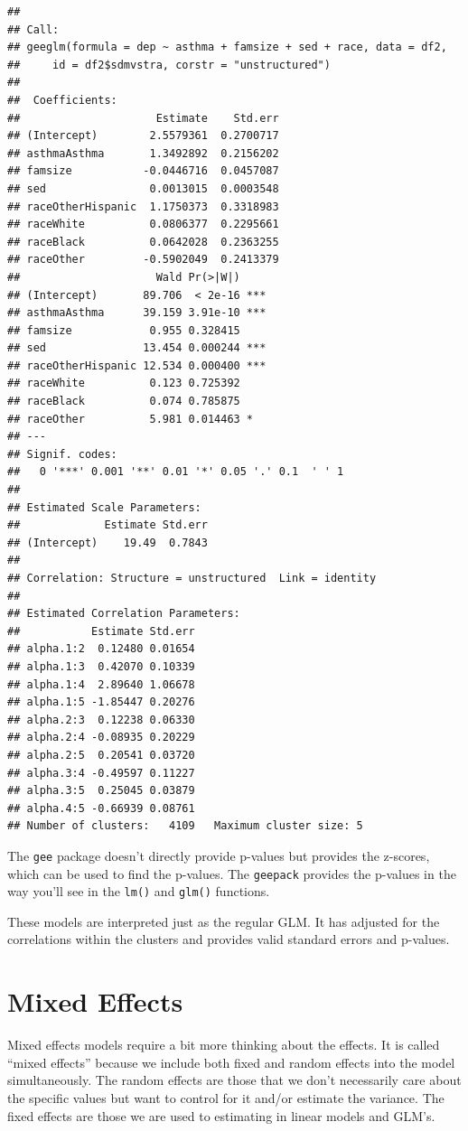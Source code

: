 \documentclass[]{tufte-book}
\theoremstyle{definition}
\theoremstyle{definition}
\theoremstyle{remark}
\begin{document}
\begin{verbatim}
## 
## Call:
## geeglm(formula = dep ~ asthma + famsize + sed + race, data = df2, 
##     id = df2$sdmvstra, corstr = "unstructured")
## 
##  Coefficients:
##                     Estimate    Std.err
## (Intercept)        2.5579361  0.2700717
## asthmaAsthma       1.3492892  0.2156202
## famsize           -0.0446716  0.0457087
## sed                0.0013015  0.0003548
## raceOtherHispanic  1.1750373  0.3318983
## raceWhite          0.0806377  0.2295661
## raceBlack          0.0642028  0.2363255
## raceOther         -0.5902049  0.2413379
##                     Wald Pr(>|W|)    
## (Intercept)       89.706  < 2e-16 ***
## asthmaAsthma      39.159 3.91e-10 ***
## famsize            0.955 0.328415    
## sed               13.454 0.000244 ***
## raceOtherHispanic 12.534 0.000400 ***
## raceWhite          0.123 0.725392    
## raceBlack          0.074 0.785875    
## raceOther          5.981 0.014463 *  
## ---
## Signif. codes:  
##   0 '***' 0.001 '**' 0.01 '*' 0.05 '.' 0.1  ' ' 1
## 
## Estimated Scale Parameters:
##             Estimate Std.err
## (Intercept)    19.49  0.7843
## 
## Correlation: Structure = unstructured  Link = identity 
## 
## Estimated Correlation Parameters:
##           Estimate Std.err
## alpha.1:2  0.12480 0.01654
## alpha.1:3  0.42070 0.10339
## alpha.1:4  2.89640 1.06678
## alpha.1:5 -1.85447 0.20276
## alpha.2:3  0.12238 0.06330
## alpha.2:4 -0.08935 0.20229
## alpha.2:5  0.20541 0.03720
## alpha.3:4 -0.49597 0.11227
## alpha.3:5  0.25045 0.03879
## alpha.4:5 -0.66939 0.08761
## Number of clusters:   4109   Maximum cluster size: 5
\end{verbatim}

The \texttt{gee} package doesn't directly provide p-values but provides
the z-scores, which can be used to find the p-values. The
\texttt{geepack} provides the p-values in the way you'll see in the
\texttt{lm()} and \texttt{glm()} functions.

These models are interpreted just as the regular GLM. It has adjusted
for the correlations within the clusters and provides valid standard
errors and p-values.

\section*{Mixed Effects}\label{mixed-effects}

Mixed effects models require a bit more thinking about the effects. It
is called ``mixed effects'' because we include both fixed and random
effects into the model simultaneously. The random effects are those that
we don't necessarily care about the specific values but want to control
for it and/or estimate the variance. The fixed effects are those we are
used to estimating in linear models and GLM's.
\end{document}
